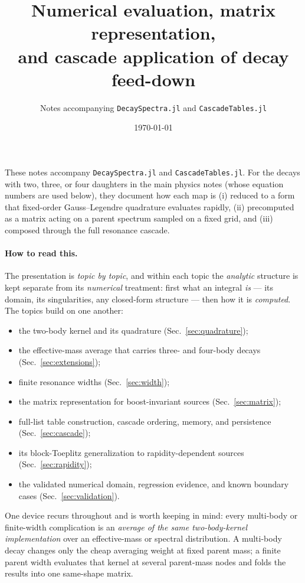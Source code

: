 \documentclass[11pt]{article}
\title{Numerical evaluation, matrix representation,\\
and cascade application of decay feed-down}
\author{Notes accompanying \texttt{DecaySpectra.jl} and
\texttt{CascadeTables.jl}}
\date{\today}
\begin{document}
\maketitle

These notes accompany \texttt{DecaySpectra.jl} and
\texttt{CascadeTables.jl}.  For the decays with two, three, or four daughters
in the main physics notes (whose equation numbers are used below), they
document how each map is (i) reduced to a form that fixed-order
Gauss--Legendre quadrature evaluates rapidly, (ii) precomputed as a matrix
acting on a parent spectrum sampled on a fixed grid, and (iii) composed
through the full resonance cascade.

\paragraph{How to read this.}
The presentation is \emph{topic by topic}, and within each topic the
\emph{analytic} structure is kept separate from its \emph{numerical}
treatment: first what an integral \emph{is} --- its domain, its
singularities, any closed-form structure --- then how it is \emph{computed}.
The topics build on one another:
\begin{itemize}
\item the two-body kernel and its quadrature (Sec.~\ref{sec:quadrature});
\item the effective-mass average that carries three- and four-body decays
(Sec.~\ref{sec:extensions});
\item finite resonance widths (Sec.~\ref{sec:width});
\item the matrix representation for boost-invariant sources
(Sec.~\ref{sec:matrix});
\item full-list table construction, cascade ordering, memory, and persistence
(Sec.~\ref{sec:cascade});
\item its block-Toeplitz generalization to rapidity-dependent sources
(Sec.~\ref{sec:rapidity});
\item the validated numerical domain, regression evidence, and known boundary
cases (Sec.~\ref{sec:validation}).
\end{itemize}
One device recurs throughout and is worth keeping in mind: every multi-body
or finite-width complication is an \emph{average of the same two-body-kernel
implementation} over an effective-mass or spectral distribution.  A
multi-body decay changes only the cheap averaging weight at fixed parent
mass; a finite parent width evaluates that kernel at several parent-mass
nodes and folds the results into one same-shape matrix.
\end{document}
